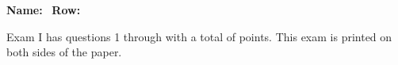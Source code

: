 \documentclass[12pt,fleqn]{exam}
\begin{document}
\newcommand{\reals}{\mathbf{R}}
\newcommand{\integers}{\mathbf{Z}}
\newcommand{\bi}{\mathbf{i}}
\newcommand{\bj}{\mathbf{j}}
\newcommand{\bk}{mathbf{k}}

\newcommand{\Mod}[1]{\ \mathrm{mod}\ #1}
\newcommand{\ex}{I}
\newenvironment{alphalist}{
  \begin{enumerate}[(a)]
    \addtolength{\itemsep}{-1.0\itemsep}}
  {\end{enumerate}}

\newenvironment{handlist}{
  \begin{enumerate}[\leftthumbsup]
    \addtolength{\itemsep}{-1.0\itemsep}}
  {\end{enumerate}}

\large
\vspace{0.1in}
\noindent{}
{\bf Name:}\hrulefill\
\noindent \makebox[3.0truein][l]{\bf Exam \ex \/}
{\bf Row:}\hrulefill\

\large

\vspace{0.1in}

\noindent Exam \ex\/  has questions 1 through  \numquestions \/ with a total of \numpoints \/ points.  This exam is printed on both sides of the paper.
\end{document}
